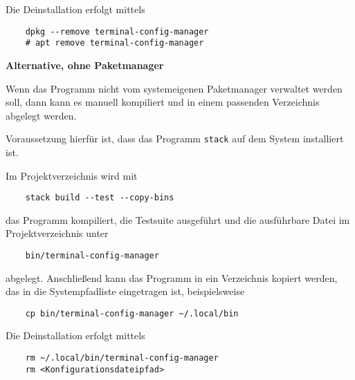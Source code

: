 Die Deinstallation erfolgt mittels

\begin{verbatim}
	dpkg --remove terminal-config-manager
	# apt remove terminal-config-manager
\end{verbatim}

\begin{center}
	\textbf{Alternative, ohne Paketmanager}
\end{center}

Wenn das Programm nicht vom systemeigenen Paketmanager verwaltet werden
soll, dann kann es manuell kompiliert und in einem passenden
Verzeichnis abgelegt werden.

Voraussetzung hierfür ist, dass das Programm \texttt{stack} auf dem
System installiert ist.

Im Projektverzeichnis wird mit

\begin{verbatim}
	stack build --test --copy-bins
\end{verbatim}

das Programm kompiliert, die Testsuite ausgeführt und die ausführbare Datei im
Projektverzeichnis unter

\begin{verbatim}
	bin/terminal-config-manager
\end{verbatim}

abgelegt. Anschließend kann das Programm in ein Verzeichnis kopiert werden, das in die
Systempfadliste eingetragen ist, beispielsweise

\begin{verbatim}
	cp bin/terminal-config-manager ~/.local/bin
\end{verbatim}

Die Deinstallation erfolgt mittels

\begin{verbatim}
	rm ~/.local/bin/terminal-config-manager
	rm <Konfigurationsdateipfad>
\end{verbatim}